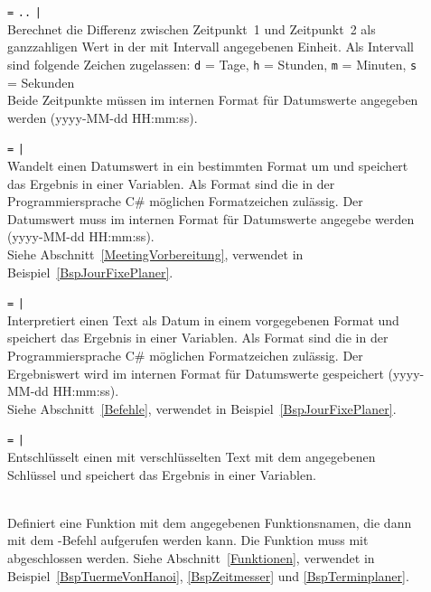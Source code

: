 \begin{description}
\item[]   \verb|=|  \verb|..|  \verb=|= \\
Berechnet die Differenz zwischen Zeitpunkt~1 und Zeitpunkt~2 als ganzzahligen Wert in der mit Intervall angegebenen Einheit. Als Intervall sind folgende Zeichen zugelassen:
\verb|d| = Tage, \verb|h| = Stunden, \verb|m| = Minuten, \verb|s| = Sekunden\\
Beide Zeitpunkte müssen im internen Format für Datumswerte angegeben werden (yyyy-MM-dd HH:mm:ss).

\item[]  \verb|=|  \verb=|= \\
Wandelt einen Datumswert in ein bestimmten Format um und speichert das Ergebnis in einer Variablen. Als Format sind die in der Programmiersprache C\# möglichen Formatzeichen zulässig. Der Datumswert muss im internen Format für Datumswerte angegebe werden (yyyy-MM-dd HH:mm:ss).\\
Siehe Abschnitt~\ref{MeetingVorbereitung}, verwendet in Beispiel~\ref{BspJourFixePlaner}.

\item[]  \verb|=|  \verb=|= \\
Interpretiert einen Text als Datum in einem vorgegebenen Format und speichert das Ergebnis in einer Variablen. Als Format sind die in der Programmiersprache C\# möglichen Formatzeichen zulässig. Der Ergebniswert wird im internen Format für Datumswerte gespeichert (yyyy-MM-dd HH:mm:ss).\\
Siehe Abschnitt~\ref{Befehle}, verwendet in Beispiel~\ref{BspJourFixePlaner}.

\item[]  \verb|=|  \verb=|=  \\
Entschlüsselt einen mit  verschlüsselten Text mit dem angegebenen Schlüssel und speichert das Ergebnis in einer Variablen.

\item[] \\
Definiert eine Funktion mit dem angegebenen Funktionsnamen, die dann mit dem -Befehl aufgerufen werden kann. Die Funktion muss mit  abgeschlossen werden.
Siehe Abschnitt~\ref{Funktionen}, verwendet in Beispiel~\ref{BspTuermeVonHanoi}, \ref{BspZeitmesser} und \ref{BspTerminplaner}.
 

\end{description}
